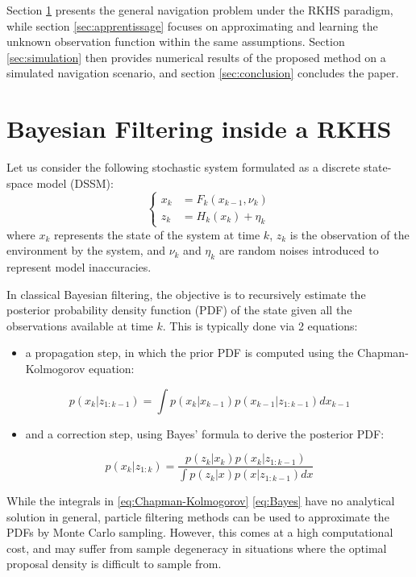 \documentclass[conference]{IEEEtran}
\begin{document}
Section \ref{sec:filtrage} presents the general navigation problem under the RKHS paradigm, while section \ref{sec:apprentissage} focuses on approximating and learning the unknown observation function within the same assumptions. Section \ref{sec:simulation} then provides numerical results of the proposed method on a simulated navigation scenario, and section \ref{sec:conclusion} concludes the paper.

\section{Bayesian Filtering inside a RKHS}\label{sec:filtrage}

Let us consider the following stochastic system formulated as a discrete state-space model (DSSM):
\begin{equation}
\left\{
\begin{aligned}
x_k&=F_k(x_{k-1},\nu_k)\\
z_k&=H_k(x_k)+\eta_k
\end{aligned}
\right.\label{eq:navigation equations}
\end{equation}
where $x_k$ represents the state of the system at time $k$, $z_k$ is the observation of the environment by the system, and $\nu_k$ and $\eta_k$ are random noises introduced to represent model inaccuracies.

In classical Bayesian filtering, the objective is to recursively estimate the posterior probability density function (PDF) of the state given all the observations available at time $k$. This is typically done via 2 equations:
\begin{itemize}
\item a propagation step, in which the prior PDF is computed using the Chapman-Kolmogorov equation:
\end{itemize}
\begin{equation}
p(x_k|z_{1:k-1})=\int{p(x_k|x_{k-1})p(x_{k-1}|z_{1:k-1})dx_{k-1}}\label{eq:Chapman-Kolmogorov}
\end{equation}
\begin{itemize}
\item and a correction step, using Bayes' formula to derive the posterior PDF:
\end{itemize}
\begin{equation}
p(x_k|z_{1:k})=\frac{p(z_k|x_k)p(x_k|z_{1:k-1})}{\int{p(z_k|x)p(x|z_{1:k-1})dx}}\label{eq:Bayes}
\end{equation}

While the integrals in \eqref{eq:Chapman-Kolmogorov} \eqref{eq:Bayes} have no analytical solution in general, particle filtering methods can be used to approximate the PDFs by Monte Carlo sampling. However, this comes at a high computational cost, and may suffer from sample degeneracy in situations where the optimal proposal density is difficult to sample from.
\end{document}
